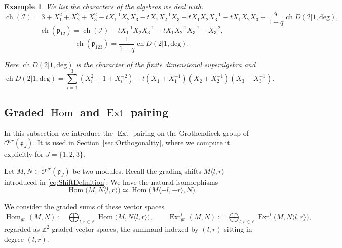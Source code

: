 \documentclass[10pt]{amsart}
\newcommand{\sh}[2]{\langle #1,#2\rangle}
\newtheorem{example}[theorem]{Example}
\newcommand{\fp}{{\mathfrak p}}
\newcommand{\fh}{{\mathfrak h}}
\newcommand{\Ddeg}{D(2|1,\mathrm{deg})}
\DeclareMathOperator{\ch}{ch}
\DeclareMathOperator{\Hom}{Hom}
\DeclareMathOperator{\Ext}{Ext}
\begin{document}
	
	\begin{example} We list the characters of the algebras we deal with.
		\[\ch(\mathcal{I})=3+X_1^2+X_2^2+X_3^2-tX_1^{-1}X_2X_3-tX_1X_2^{-1}X_3-tX_1X_2X_3^{-1}-tX_1X_2X_3+\frac{q}{1-q}\ch \Ddeg,\]
		\begin{equation*}
			\label{eq:ParabolicAlgebraCharacter}
			\ch(\fp_{12})=\ch(\mathcal{I})-tX_1^{-1}X_2X_3^{-1}-tX_1X_2^{-1}X_3^{-1}+X_3^{-2},
		\end{equation*}
		\begin{equation*} \label{eq:CurrentAlgebraCharacter}   
			\ch(\fp_{123})=\frac{1}{1-q}\ch \Ddeg.
		\end{equation*}
		
		Here $\ch \Ddeg$ is the character of the finite dimensional superalgebra and
		\[\ch \Ddeg=\sum_{i=1}^3 (X_i^{2}+1+X_i^{-2})-t(X_1+X_1^{-1})(X_2+X_2^{-1})(X_3+X_3^{-1}).\]
	\end{example}
	
	\subsection{Graded \texorpdfstring{$\Hom$}{Hom} and \texorpdfstring{$\Ext$}{Ext} pairing}\label{ssec:ExtPairing}
	In this subsection we introduce the $\Ext$ pairing on the Grothendieck group of $\mathcal{O}^{gr}(\fp_J)$. It is used in Section~\ref{sec:Orthogonality}, where we compute it explicitly for $J=\{1,2,3\}$.
	
	Let $M, N \in \mathcal{O}^{gr}(\fp_J)$ be two modules. Recall the grading shifts $M\sh{l}{r}$ introduced in \eqref{eq:ShiftDefinition}. We have the natural isomorphisms
	\[\Hom\bigl(M ,N\sh{l}{r}\bigr)\simeq \Hom\bigl(M\sh{-l}{-r} ,N\bigr).\]
	
	We consider the graded sums of these vector spaces
	\[\Hom_{gr}(M ,N):=\bigoplus_{l,r \in \mathbb{Z}}\Hom\bigl(M ,N\sh{l}{r}\bigr),\qquad
	\Ext^{i}_{gr}(M ,N):=\bigoplus_{l,r \in \mathbb{Z}}\Ext^{i}\bigl(M ,N\sh{l}{r}\bigr),\]
	regarded as $\mathbb{Z}^2$-graded vector spaces, the summand indexed by $(l,r)$ sitting in degree $(l,r)$.
	
\end{document}
